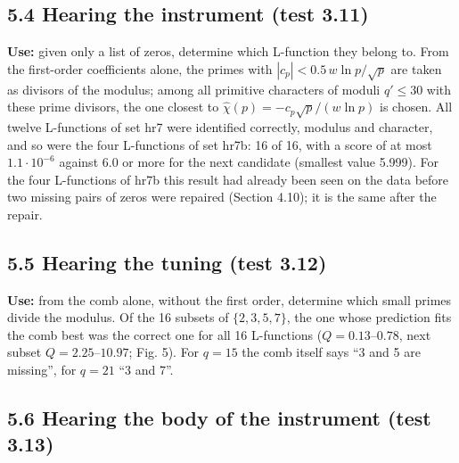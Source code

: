 \documentclass[
  10pt,
]{article}
\begin{document}
\hypertarget{hearing-the-instrument-test-3.11}{%
\subsection{5.4 Hearing the instrument (test
3.11)}\label{hearing-the-instrument-test-3.11}}

\textbf{Use:} given only a list of zeros, determine which L-function
they belong to. From the first-order coefficients alone, the primes with
\(|c_p| < 0.5\,w\ln p/\sqrt p\) are taken as divisors of the modulus;
among all primitive characters of moduli \(q' \le 30\) with these prime
divisors, the one closest to \(\hat\chi(p) = -c_p\sqrt p/(w\ln p)\) is
chosen. All twelve L-functions of set hr7 were identified correctly,
modulus and character, and so were the four L-functions of set hr7b: 16
of 16, with a score of at most \(1.1\cdot10^{-6}\) against 6.0 or more
for the next candidate (smallest value 5.999). For the four L-functions
of hr7b this result had already been seen on the data before two missing
pairs of zeros were repaired (Section 4.10); it is the same after the
repair.

\hypertarget{hearing-the-tuning-test-3.12}{%
\subsection{5.5 Hearing the tuning (test
3.12)}\label{hearing-the-tuning-test-3.12}}

\textbf{Use:} from the comb alone, without the first order, determine
which small primes divide the modulus. Of the 16 subsets of
\(\{2, 3, 5, 7\}\), the one whose prediction fits the comb best was the
correct one for all 16 L-functions (\(Q = 0.13\)--\(0.78\), next subset
\(Q = 2.25\)--\(10.97\); Fig. 5). For \(q = 15\) the comb itself says
``3 and 5 are missing'', for \(q = 21\) ``3 and 7''.

\hypertarget{hearing-the-body-of-the-instrument-test-3.13}{%
\subsection{5.6 Hearing the body of the instrument (test
3.13)}\label{hearing-the-body-of-the-instrument-test-3.13}}
\end{document}
